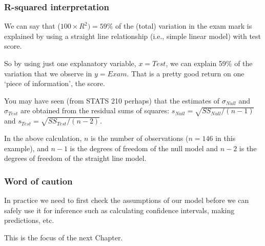 \documentclass{beamer}\usepackage[]{graphicx}\usepackage[]{xcolor}
\begin{document}
\begin{frame}[fragile]
\frametitle{R-squared interpretation}

We can say that ($100\times R^2)= 59\%$ of the (total) variation in the exam mark is explained by using a straight line relationship (i.e., simple linear model) with
test score.

So by using just one explanatory variable, $x=Test$,  we can explain 59\% of the variation that we observe in $y=Exam$.
That is a pretty good return on one `piece of information', the  score.
\medskip \medskip

You may have seen (from STATS 210 perhaps) that the estimates of 
$\sigma_{Null}$ and $\sigma_{Test}$ are obtained from the residual sums of squares:
$s_{Null}=\sqrt{SS_{Null}/(n-1)}$ and $s_{Test}=\sqrt{SS_{Test}/(n-2)}$.
\medskip

In the above calculation, $n$ is the number of observations ($n=146$ in this example), 
and $n-1$ is the degrees of freedom of the null model 
and $n-2$ is the degrees of freedom of the straight line model.

\end{frame}


\begin{frame}
\frametitle{Word of caution}

\medskip

In practice we need to first check the assumptions of our model before we can safely
use it for inference such as calculating confidence intervals, making predictions, etc.
\medskip

This is the focus of the next Chapter.
\end{frame}


\end{document}
